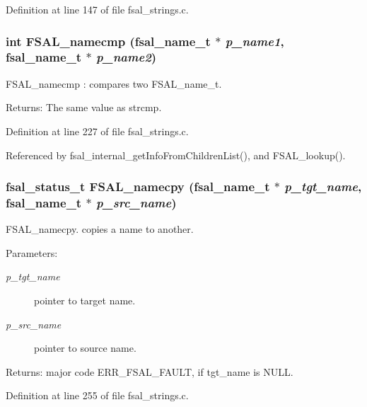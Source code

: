 Definition at line 147 of file fsal\_\-strings.c.
\subsubsection{\setlength{\rightskip}{0pt plus 5cm}int FSAL\_\-namecmp (fsal\_\-name\_\-t $\ast$ {\em p\_\-name1}, fsal\_\-name\_\-t $\ast$ {\em p\_\-name2})}\label{group__FSALNameFunctions_ga4}


FSAL\_\-namecmp : compares two FSAL\_\-name\_\-t.

\begin{Desc}
\item[Returns:]The same value as strcmp. \end{Desc}


Definition at line 227 of file fsal\_\-strings.c.

Referenced by fsal\_\-internal\_\-get\-Info\-From\-Children\-List(), and FSAL\_\-lookup().
\subsubsection{\setlength{\rightskip}{0pt plus 5cm}fsal\_\-status\_\-t FSAL\_\-namecpy (fsal\_\-name\_\-t $\ast$ {\em p\_\-tgt\_\-name}, fsal\_\-name\_\-t $\ast$ {\em p\_\-src\_\-name})}\label{group__FSALNameFunctions_ga6}


FSAL\_\-namecpy. copies a name to another.

\begin{Desc}
\item[Parameters:]
\begin{description}
\item[{\em p\_\-tgt\_\-name}]pointer to target name. \item[{\em p\_\-src\_\-name}]pointer to source name. \end{description}
\end{Desc}
\begin{Desc}
\item[Returns:]major code ERR\_\-FSAL\_\-FAULT, if tgt\_\-name is NULL. \end{Desc}


Definition at line 255 of file fsal\_\-strings.c.
